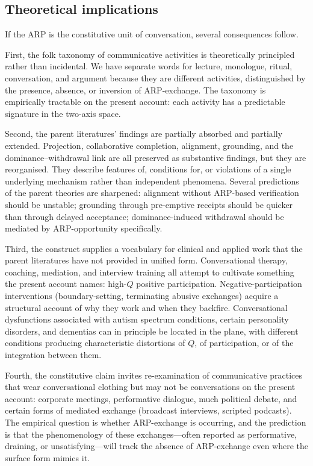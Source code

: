 \subsection{Theoretical implications}

If the ARP is the constitutive unit of conversation, several consequences follow.

First, the folk taxonomy of communicative activities is theoretically principled rather than incidental. We have separate words for lecture, monologue, ritual, conversation, and argument because they are different activities, distinguished by the presence, absence, or inversion of ARP-exchange. The taxonomy is empirically tractable on the present account: each activity has a predictable signature in the two-axis space.

Second, the parent literatures' findings are partially absorbed and partially extended. Projection, collaborative completion, alignment, grounding, and the dominance--withdrawal link are all preserved as substantive findings, but they are reorganised. They describe features of, conditions for, or violations of a single underlying mechanism rather than independent phenomena. Several predictions of the parent theories are sharpened: alignment without ARP-based verification should be unstable; grounding through pre-emptive receipts should be quicker than through delayed acceptance; dominance-induced withdrawal should be mediated by ARP-opportunity specifically.

Third, the construct supplies a vocabulary for clinical and applied work that the parent literatures have not provided in unified form. Conversational therapy, coaching, mediation, and interview training all attempt to cultivate something the present account names: high-$Q$ positive participation. Negative-participation interventions (boundary-setting, terminating abusive exchanges) acquire a structural account of why they work and when they backfire. Conversational dysfunctions associated with autism spectrum conditions, certain personality disorders, and dementias can in principle be located in the plane, with different conditions producing characteristic distortions of $Q$, of participation, or of the integration between them.

Fourth, the constitutive claim invites re-examination of communicative practices that wear conversational clothing but may not be conversations on the present account: corporate meetings, performative dialogue, much political debate, and certain forms of mediated exchange (broadcast interviews, scripted podcasts). The empirical question is whether ARP-exchange is occurring, and the prediction is that the phenomenology of these exchanges---often reported as performative, draining, or unsatisfying---will track the absence of ARP-exchange even where the surface form mimics it.

